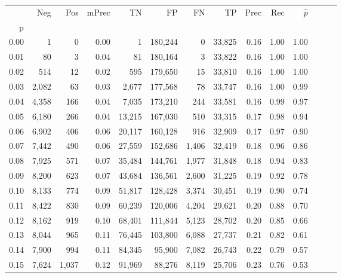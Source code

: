 \begin{tabular}{rrrrrrrrrrrrrr}
\toprule
{} &    Neg &    Pos & mPrec &       TN &       FP &      FN &      TP &  Prec &   Rec & $\hat{p}$ \\
p    &        &        &       &          &          &         &         &       &       &           \\
\midrule
0.00 &      1 &      0 &  0.00 &        1 &  180,244 &       0 &  33,825 &  0.16 &  1.00 &      1.00 \\
0.01 &     80 &      3 &  0.04 &       81 &  180,164 &       3 &  33,822 &  0.16 &  1.00 &      1.00 \\
0.02 &    514 &     12 &  0.02 &      595 &  179,650 &      15 &  33,810 &  0.16 &  1.00 &      1.00 \\
0.03 &  2,082 &     63 &  0.03 &    2,677 &  177,568 &      78 &  33,747 &  0.16 &  1.00 &      0.99 \\
0.04 &  4,358 &    166 &  0.04 &    7,035 &  173,210 &     244 &  33,581 &  0.16 &  0.99 &      0.97 \\
0.05 &  6,180 &    266 &  0.04 &   13,215 &  167,030 &     510 &  33,315 &  0.17 &  0.98 &      0.94 \\
0.06 &  6,902 &    406 &  0.06 &   20,117 &  160,128 &     916 &  32,909 &  0.17 &  0.97 &      0.90 \\
0.07 &  7,442 &    490 &  0.06 &   27,559 &  152,686 &   1,406 &  32,419 &  0.18 &  0.96 &      0.86 \\
0.08 &  7,925 &    571 &  0.07 &   35,484 &  144,761 &   1,977 &  31,848 &  0.18 &  0.94 &      0.83 \\
0.09 &  8,200 &    623 &  0.07 &   43,684 &  136,561 &   2,600 &  31,225 &  0.19 &  0.92 &      0.78 \\
0.10 &  8,133 &    774 &  0.09 &   51,817 &  128,428 &   3,374 &  30,451 &  0.19 &  0.90 &      0.74 \\
0.11 &  8,422 &    830 &  0.09 &   60,239 &  120,006 &   4,204 &  29,621 &  0.20 &  0.88 &      0.70 \\
0.12 &  8,162 &    919 &  0.10 &   68,401 &  111,844 &   5,123 &  28,702 &  0.20 &  0.85 &      0.66 \\
0.13 &  8,044 &    965 &  0.11 &   76,445 &  103,800 &   6,088 &  27,737 &  0.21 &  0.82 &      0.61 \\
0.14 &  7,900 &    994 &  0.11 &   84,345 &   95,900 &   7,082 &  26,743 &  0.22 &  0.79 &      0.57 \\
0.15 &  7,624 &  1,037 &  0.12 &   91,969 &   88,276 &   8,119 &  25,706 &  0.23 &  0.76 &      0.53 \\

\end{tabular}
